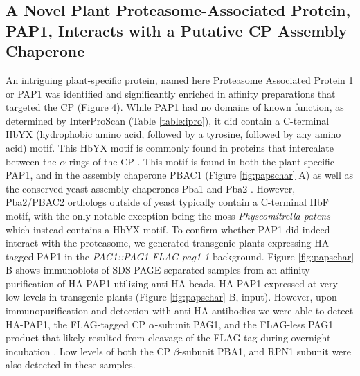 \subsection{A Novel Plant Proteasome-Associated Protein, PAP1, Interacts with a Putative CP Assembly Chaperone}
An intriguing plant-specific protein, named here Proteasome Associated Protein 1 or PAP1 was identified and significantly enriched in affinity preparations that targeted the CP (Figure 4). While PAP1 had no domains of known function, as determined by InterProScan (Table \ref{table:ipro}), it did contain a C-terminal HbYX (hydrophobic amino acid, followed by a tyrosine, followed by any amino acid) motif. This HbYX motif is commonly found in proteins that intercalate between the $\alpha$-rings of the CP \citep{kusmierczyk11}. This motif is found in both the plant specific PAP1, and in the assembly chaperone PBAC1 (Figure \ref{fig:papschar} A) as well as the conserved yeast assembly chaperones Pba1 and Pba2 \citep{kusmierczyk11}. However, Pba2/PBAC2 orthologs outside of yeast typically contain a C-terminal HbF motif, with the only notable exception being the moss \textit{Physcomitrella patens} which instead contains a HbYX motif.   To confirm whether PAP1 did indeed interact with the proteasome, we generated transgenic plants expressing HA-tagged PAP1 in the \textit{PAG1::PAG1-FLAG pag1-1} background. Figure \ref{fig:papschar} B shows immunoblots of SDS-PAGE separated samples from an affinity purification of HA-PAP1 utilizing anti-HA beads. HA-PAP1 expressed at very low levels in transgenic plants (Figure \ref{fig:papschar} B, input). However, upon immunopurification and detection with anti-HA antibodies we were able to detect HA-PAP1, the FLAG-tagged CP $\alpha$-subunit PAG1, and the FLAG-less PAG1 product that likely resulted from cleavage of the FLAG tag during overnight incubation \citep{book10}. Low levels of both the CP $\beta$-subunit PBA1, and RPN1 subunit were also detected in these samples. 

